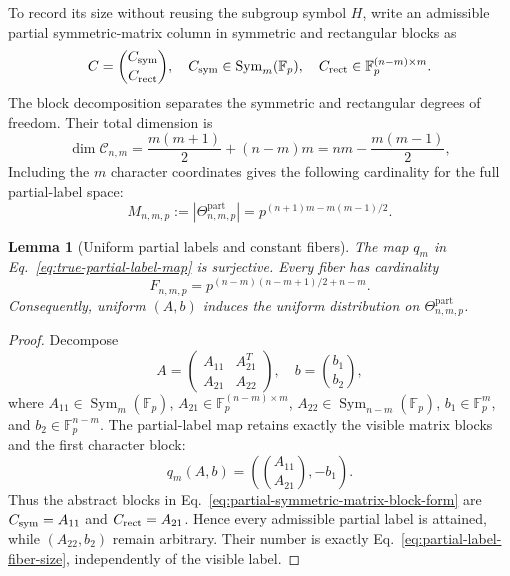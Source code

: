 \documentclass[11pt]{article}
\newcommand{\F}{\mathbb F}
\newcommand{\Sym}{\operatorname{Sym}}
\newcommand{\1}{\mathbf 1}
\theoremstyle{plain}
\newtheorem{lemma}[theorem]{Lemma}
\theoremstyle{definition}
\theoremstyle{remark}
\begin{document}
To record its size without reusing the subgroup symbol $H$, write an
admissible partial symmetric-matrix column in symmetric and rectangular blocks as
\begin{equation}
 C=\binom{C_{\rm sym}}{C_{\rm rect}},
 \quad C_{\rm sym}\in\Sym_m(\F_p),\quad
 C_{\rm rect}\in\F_p^{(n-m)\times m}.
 \label{eq:partial-symmetric-matrix-block-form}
\end{equation}
The block decomposition separates the symmetric and rectangular degrees of
freedom.  Their total dimension is
\begin{equation}
 \dim\mathcal C_{n,m}
 =\frac{m(m+1)}2+(n-m)m
 =nm-\frac{m(m-1)}2,
 \label{eq:partial-symmetric-matrix-dimension}
\end{equation}
Including the $m$ character coordinates gives the following cardinality for
the full partial-label space:
\begin{equation}
 M_{n,m,p}
 :=|\Theta_{n,m,p}^{\mathrm{part}}|
 =p^{(n+1)m-m(m-1)/2}.
 \label{eq:partial-label-cardinality}
\end{equation}

\begin{lemma}[Uniform partial labels and constant fibers]
\label{lem:uniform-partial-labels}
The map $q_m$ in Eq.~\eqref{eq:true-partial-label-map} is surjective.  Every
fiber has cardinality
\begin{equation}
 F_{n,m,p}
 =p^{(n-m)(n-m+1)/2+n-m}.
 \label{eq:partial-label-fiber-size}
\end{equation}
Consequently, uniform $(A,b)$ induces the uniform distribution on
$\Theta_{n,m,p}^{\mathrm{part}}$.
\end{lemma}

\begin{proof}
Decompose
\begin{equation}
 A=\begin{pmatrix}A_{11}&A_{21}^T\\A_{21}&A_{22}\end{pmatrix},
 \quad b=\binom{b_1}{b_2},
 \label{eq:partial-label-fiber-blocks}
\end{equation}
where $A_{11}\in\Sym_m(\F_p)$, $A_{21}\in\F_p^{(n-m)\times m}$,
$A_{22}\in\Sym_{n-m}(\F_p)$, $b_1\in\F_p^m$, and
$b_2\in\F_p^{n-m}$.  The partial-label map retains exactly the visible
matrix blocks and the first character block:
\begin{equation}
 q_m(A,b)=\left(\binom{A_{11}}{A_{21}},-b_1\right).
 \label{eq:partial-label-visible-blocks}
\end{equation}
Thus the abstract blocks in Eq.~\eqref{eq:partial-symmetric-matrix-block-form} are
$C_{\rm sym}=A_{11}$ and $C_{\rm rect}=A_{21}$.  Hence every admissible
partial label is attained, while $(A_{22},b_2)$ remain
arbitrary.  Their number is exactly Eq.~\eqref{eq:partial-label-fiber-size},
independently of the visible label.
\end{proof}
\end{document}
